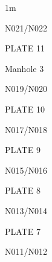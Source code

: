 \documentclass[a4paper,portrait,12pt]{article}
\begin{document}
\begin{flushleft}
1m
\end{flushleft}


\begin{flushleft}
N021/N022
\end{flushleft}





\begin{flushleft}
PLATE 11
\end{flushleft}


\begin{flushleft}
Manhole 3
\end{flushleft}





\begin{flushleft}
N019/N020
\end{flushleft}





\begin{flushleft}
PLATE 10
\end{flushleft}


\begin{flushleft}
N017/N018
\end{flushleft}





\begin{flushleft}
PLATE 9
\end{flushleft}


\begin{flushleft}
N015/N016
\end{flushleft}





\begin{flushleft}
PLATE 8
\end{flushleft}


\begin{flushleft}
N013/N014
\end{flushleft}





\begin{flushleft}
PLATE 7
\end{flushleft}


\begin{flushleft}
N011/N012
\end{flushleft}
\end{document}

